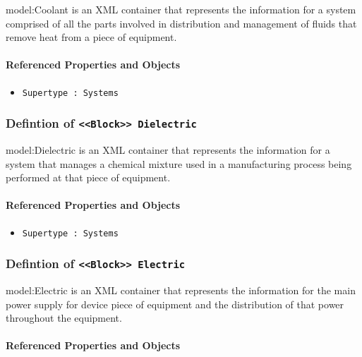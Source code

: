 \FloatBarrier

{model:Coolant} is an XML container that represents the information for a system comprised of all the parts involved in distribution and management of fluids that remove heat from a piece of equipment.

\FloatBarrier
\paragraph{Referenced Properties and Objects}

\begin{itemize}
\item \texttt{Supertype : Systems}

\end{itemize}
\FloatBarrier
\subsubsection{Defintion of \texttt{<<Block>> Dielectric}}
  \label{type:Dielectric}

\FloatBarrier

{model:Dielectric} is an XML container that represents the information for a system that manages a chemical mixture used in a manufacturing process being performed at that piece of equipment.

\FloatBarrier
\paragraph{Referenced Properties and Objects}

\begin{itemize}
\item \texttt{Supertype : Systems}

\end{itemize}
\FloatBarrier
\subsubsection{Defintion of \texttt{<<Block>> Electric}}
  \label{type:Electric}

\FloatBarrier

{model:Electric} is an XML container that represents the information for the main power supply for device piece of equipment and the distribution of that power throughout the equipment.

\FloatBarrier
\paragraph{Referenced Properties and Objects}

